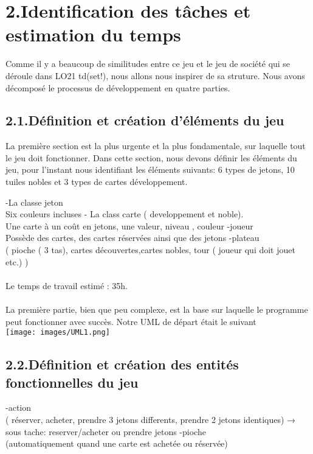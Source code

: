 \documentclass[a4paper]{article}
\begin{document}
\section*{2.Identification des tâches et estimation du temps}
Comme il y a beaucoup de similitudes entre ce jeu et le jeu de société qui se déroule dans LO21 td(set!), nous allons nous inspirer de sa struture.
Nous avons décomposé le processus de développement en quatre parties.\\

\subsection*{2.1.Définition et création d'éléments du jeu}
La première section est la plus urgente et la plus fondamentale, sur laquelle tout le jeu doit fonctionner. Dans cette section, nous devons définir les éléments du jeu, pour l'instant nous identifiant les éléments suivants: 6 types de jetons, 10 tuiles nobles et 3 types de cartes développement.

-La classe jeton\\
    Six couleurs incluses
- La class carte ( developpement et noble).\\
    Une carte à un coût en jetons, une valeur, niveau , couleur 
-joueur\\
Possède des cartes, des cartes réservées ainsi que des jetons
-plateau \\
( pioche ( 3 tas), cartes découvertes,cartes nobles, tour ( joueur qui doit jouet etc.) )\\
\\
Le temps de travail estimé :  35h.\\
\\
La première partie, bien que peu complexe, est la base sur laquelle le programme peut fonctionner avec succès.
Notre UML de départ était le suivant\\
\texttt{[image: images/UML1.png]}

\subsection*{2.2.Définition et création des entités fonctionnelles du jeu}
-action \\
( réserver, acheter, prendre 3 jetons differents, prendre 2 jetons identiques)
    → sous tache: reserver/acheter ou prendre jetons
-pioche \\
(automatiquement quand une carte est achetée ou réservée)
\end{document}
